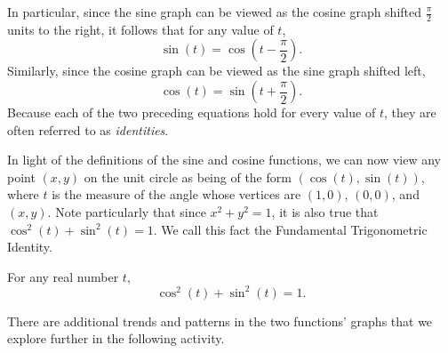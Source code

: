 \documentclass[nooutcomes]{ximera}
\begin{document}
In particular, since the sine graph can be viewed as the cosine graph shifted \(\frac{\pi}{2}\) units to the right, it follows that for any value of \(t\),%
\begin{equation*}
\sin(t) = \cos(t-\frac{\pi}{2})\text{.}
\end{equation*}
Similarly, since the cosine graph can be viewed as the sine graph shifted left,%
\begin{equation*}
\cos(t) = \sin(t + \frac{\pi}{2})\text{.}
\end{equation*}
Because each of the two preceding equations hold for every value of \(t\), they are often referred to as \emph{identities}.%
\par
\hypertarget{p-1054}{}%
In light of the definitions of the sine and cosine functions, we can now view any point \((x,y)\) on the unit circle as being of the form \((\cos(t),\sin(t))\), where \(t\) is the measure of the angle whose vertices are \((1,0)\), \((0,0)\), and \((x,y)\).  Note particularly that since \(x^2 + y^2 = 1\), it is also true that \(\cos^2(t) + \sin^2(t) = 1\).  We call this fact the Fundamental Trigonometric Identity.%

\begin{callout}
For any real number \(t\),%
\begin{equation*}
\cos^2(t) + \sin^2(t) = 1\text{.}
\end{equation*}
\end{callout}

There are additional trends and patterns in the two functions' graphs that we explore further in the following activity.
\end{document}
